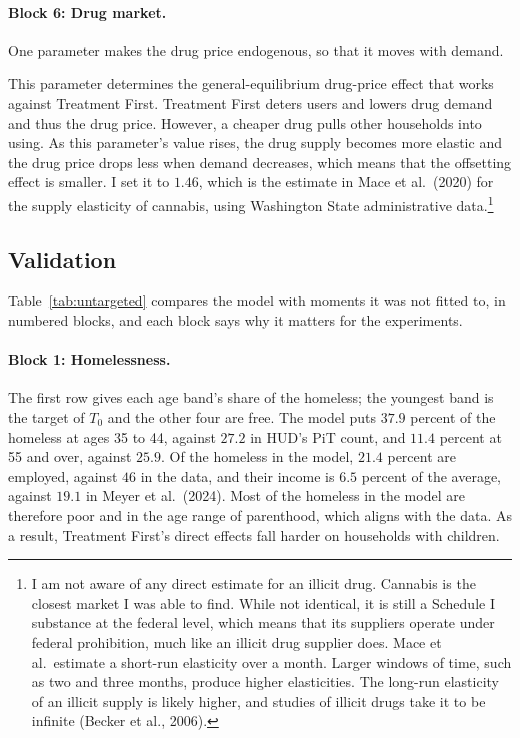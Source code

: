 \documentclass[10pt]{article}
\begin{document}
\paragraph{Block 6: Drug market.} One parameter makes the drug price endogenous, so that it moves with demand.
\begin{description}\setlength{\itemsep}{0.25em}\setlength{\parskip}{0em}
\item[$\varepsilon_s$, the price elasticity of drug supply.]   This parameter determines the general-equilibrium drug-price effect that works against Treatment First. Treatment First deters users and lowers drug demand and thus the drug price. However, a cheaper drug pulls other households into using. As this parameter's value rises, the drug supply becomes more elastic and the drug price drops less when demand decreases, which means that the offsetting effect is smaller. I set it to $1.46$, which is the estimate in Mace et al.\ (2020) for the supply elasticity of cannabis, using Washington State administrative data.\footnote{  I am not aware of any direct estimate for an illicit drug. Cannabis is the closest market I was able to find. While not identical, it is still a Schedule I substance at the federal level, which means that its suppliers operate under federal prohibition, much like an illicit drug supplier does. Mace et al.\ estimate a short-run elasticity over a month. Larger windows of time, such as two and three months, produce higher elasticities. The long-run elasticity of an illicit supply is likely higher, and studies of illicit drugs take it to be infinite (Becker et al., 2006).}
\end{description}

\subsection{Validation}\label{sec:fvalid}

Table~\ref{tab:untargeted} compares the model with moments it was not fitted to, in numbered blocks, and each block says why it matters for the experiments.

\paragraph{Block 1: Homelessness.} The first row gives each age band's share of the homeless; the youngest band is the target of $T_0$ and the other four are free. The model puts $37.9$ percent of the homeless at ages 35 to 44, against $27.2$ in HUD's PiT count, and $11.4$ percent at 55 and over, against $25.9$. Of the homeless in the model, $21.4$ percent are employed, against $46$ in the data, and their income is $6.5$ percent of the average, against $19.1$ in Meyer et al.\ (2024).   Most of the homeless in the model are therefore poor and in the age range of parenthood, which aligns with the data.  As a result, Treatment First's direct effects fall harder on households with children.
\end{document}
